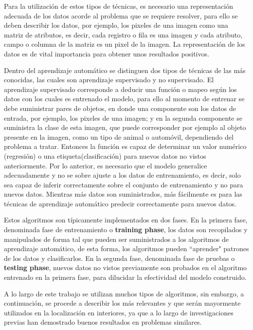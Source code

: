 Para la utilización de estos tipos de técnicas, es necesario una representación adecuada de los datos acorde al problema que se requiere resolver, para ello se deben describir los datos, por ejemplo, los pixeles de una imagen como una matriz de atributos, es decir, cada registro o fila es una imagen y cada atributo, campo o columna de la matriz es un pixel de la imagen. La representación de los datos es de vital importancia para obtener unos resultados positivos.

Dentro del aprendizaje automático se distinguen dos tipos de técnicas de las más conocidas, las cuales son aprendizaje supervisado y no supervisado. El aprendizaje supervisado corresponde a deducir una función o mapeo según los datos con los cuales es entrenado el modelo, para ello al momento de entrenar se debe suministrar pares de objetos, en donde una componente son los datos de entrada, por ejemplo, los pixeles de una imagen; y en la segunda componente se suministra la clase de esta imagen, que puede corresponder por ejemplo al objeto presente en la imagen, como un tipo de animal o automóvil, dependiendo del problema a tratar. Entonces la función es capaz de determinar un valor numérico (regresión) o una etiqueta(clasificación) para nuevos datos no vistos anteriormente. Por lo anterior, es necesario que el modelo generalice adecuadamente y no se sobre ajuste a los datos de entrenamiento, es decir, solo sea capaz de inferir correctamente sobre el conjunto de entrenamiento y no para nuevos datos. Mientras más datos son suministrados, más fácilmente es para las técnicas de aprendizaje automático predecir correctamente para nuevos datos.

Estos algoritmos son típicamente implementados en dos fases. En la primera fase, denominada fase de entrenamiento o \textbf{training phase}, los datos son recopilados y manipulados de forma tal que pueden ser suministrados a los algoritmos de aprendizaje automático, de esta forma, los algoritmos pueden ``aprender" patrones de los datos y clasificarlos. En la segunda fase, denominada fase de pruebas o \textbf{testing phase}, nuevos datos no vistos previamente son probados en el algoritmo entrenado en la primera fase, para dilucidar la efectividad del modelo construido.

A lo largo de este trabajo se utilizan muchos tipos de algoritmos, sin embargo, a continuación, se procede a describir los más relevantes y que serán mayormente utilizados en la localización en interiores, ya que a lo largo de investigaciones previas han demostrado buenos resultados en problemas similares.


